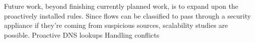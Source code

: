 \documentclass{sig-alternate}
\newcommand\system{NetAssay}
\begin{document}
Future work, beyond finishing currently planned work, is to expand upon the proactively installed rules. Since flows can be classified to pass through a security appliance if they're coming from suspicious sources, scalability studies are possible. 
Proactive DNS lookups
Handling conflicts




%

%
%
\end{document}
